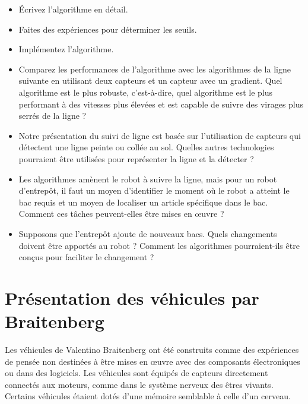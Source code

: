 {\begin{framed}
\begin{itemize}
\item Écrivez l'algorithme en détail.
\item Faites des expériences pour déterminer les seuils.
\item Implémentez l'algorithme.
\item Comparez les performances de l'algorithme avec les algorithmes de la ligne suivante en utilisant deux capteurs et un capteur avec un gradient. Quel algorithme est le plus robuste, c'est-à-dire, quel algorithme est le plus performant à des vitesses plus élevées et est capable de suivre des virages plus serrés de la ligne ?
\end{itemize}
\end{framed}

\begin{framed}
\begin{itemize}
\item Notre présentation du suivi de ligne est basée sur l'utilisation de capteurs qui détectent une ligne peinte ou collée au sol. Quelles autres technologies pourraient être utilisées pour représenter la ligne et la détecter ?
\item Les algorithmes amènent le robot à suivre la ligne, mais pour un robot d'entrepôt, il faut un moyen d'identifier le moment où le robot a atteint le bac requis et un moyen de localiser un article spécifique dans le bac. Comment ces tâches peuvent-elles être mises en œuvre ?
\item Supposons que l'entrepôt ajoute de nouveaux bacs. Quels changements doivent être apportés au robot ? Comment les algorithmes pourraient-ils être conçus pour faciliter le changement ?
\end{itemize}
\end{framed}

\section{Présentation des véhicules par Braitenberg}\label{s.abstract-vehicles}

Les véhicules de Valentino Braitenberg ont été construits comme des expériences de pensée non destinées à être mises en œuvre avec des composants électroniques ou dans des logiciels. Les véhicules sont équipés de capteurs directement connectés aux moteurs, comme dans le système nerveux des êtres vivants. Certains véhicules étaient dotés d'une mémoire semblable à celle d'un cerveau.

}
